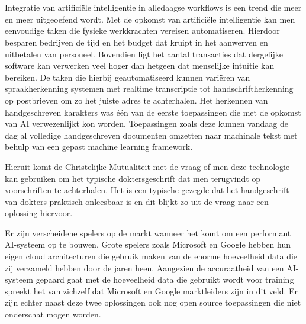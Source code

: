 
\chapter{}
\label{ch:inleiding}

Integratie van artificiële intelligentie in alledaagse workflows is een trend die meer en meer uitgeoefend wordt. Met de opkomst van artificiële intelligentie kan men eenvoudige taken die fysieke werkkrachten vereisen automatiseren. Hierdoor besparen bedrijven de tijd en het budget dat kruipt in het aanwerven en uitbetalen van personeel. Bovendien ligt het aantal transacties dat dergelijke software kan verwerken veel hoger dan hetgeen dat menselijke intuïtie kan bereiken. De taken die hierbij geautomatiseerd kunnen variëren van spraakherkenning systemen met realtime transcriptie tot handschriftherkenning op postbrieven om zo het juiste adres te achterhalen. Het herkennen van handgeschreven karakters was één van de eerste toepassingen die met de opkomst van AI verwezenlijkt kon worden. Toepassingen zoals deze kunnen vandaag de dag al volledige handgeschreven documenten omzetten naar machinale tekst met behulp van een gepast machine learning framework.  

Hieruit komt de Christelijke Mutualiteit met de vraag of men deze technologie kan gebruiken om het typische doktersgeschrift dat men terugvindt op voorschriften te achterhalen. Het is een typische gezegde dat het handgeschrift van dokters praktisch onleesbaar is en dit blijkt zo uit de vraag naar een oplossing hiervoor. 

Er zijn verscheidene spelers op de markt wanneer het komt om een performant AI-systeem op te bouwen. Grote spelers zoals Microsoft en Google hebben hun eigen cloud architecturen die gebruik maken van de enorme hoeveelheid data die zij verzameld hebben door de jaren heen. Aangezien de accuraatheid van een AI-systeem gepaard gaat met de hoeveelheid data die gebruikt wordt voor training spreekt het van zichzelf dat Microsoft en Google marktleiders zijn in dit veld. Er zijn echter naast deze twee oplossingen ook nog open source toepassingen die niet onderschat mogen worden.  


\section{}
\label{sec:probleemstelling}

